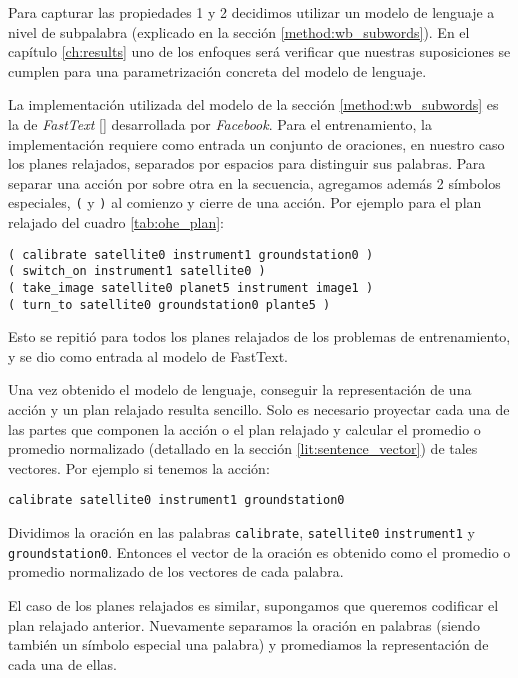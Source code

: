 Para capturar las propiedades 1 y 2 decidimos utilizar un modelo de lenguaje a nivel de subpalabra (explicado en la sección \ref{method:wb_subwords}). En el capítulo \ref{ch:results} uno de los enfoques será verificar que nuestras suposiciones se cumplen para una parametrización concreta del modelo de lenguaje.

La implementación utilizada del modelo de la sección \ref{method:wb_subwords} es la de \emph{FastText} \ref{} desarrollada por \emph{Facebook}. Para el entrenamiento, la implementación requiere como entrada un conjunto de oraciones, en nuestro caso los planes relajados, separados por espacios para distinguir sus palabras. Para separar una acción por sobre otra en la secuencia, agregamos además 2 símbolos especiales, \verb|(| y \verb|)| al comienzo y cierre de una acción. Por ejemplo para el plan relajado del cuadro \ref{tab:ohe_plan}:

\begin{center}
    \verb|( calibrate satellite0 instrument1 groundstation0 )| \\
    \verb|( switch_on instrument1 satellite0 )| \\
    \verb|( take_image satellite0 planet5 instrument image1 )| \\
    \verb|( turn_to satellite0 groundstation0 plante5 )|
\end{center}

Esto se repitió para todos los planes relajados de los problemas de entrenamiento, y se dio como entrada al modelo de FastText.

Una vez obtenido el modelo de lenguaje, conseguir la representación de una acción y un plan relajado resulta sencillo. Solo es necesario proyectar cada una de las partes que componen la acción o el plan relajado y calcular el promedio o promedio normalizado (detallado en la sección \ref{lit:sentence_vector}) de tales vectores. Por ejemplo si tenemos la acción:

\begin{center}
    \verb|calibrate satellite0 instrument1 groundstation0|    
\end{center}

Dividimos la oración en las palabras \verb|calibrate|,  \verb|satellite0| \verb|instrument1| y \verb|groundstation0|. Entonces el vector de la oración es obtenido como el promedio o promedio normalizado de los vectores de cada palabra.

El caso de los planes relajados es similar, supongamos que queremos codificar el plan relajado anterior. Nuevamente separamos la oración en palabras (siendo también un símbolo especial una palabra) y promediamos la representación de cada una de ellas.

